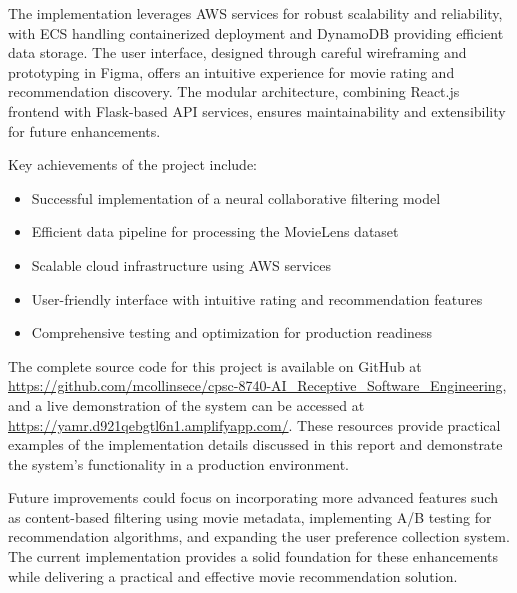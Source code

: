 \documentclass[12pt]{article}
\begin{document}
The implementation leverages AWS services for robust scalability and reliability, with ECS handling containerized deployment and DynamoDB providing efficient data storage. The user interface, designed through careful wireframing and prototyping in Figma, offers an intuitive experience for movie rating and recommendation discovery. The modular architecture, combining React.js frontend with Flask-based API services, ensures maintainability and extensibility for future enhancements.

Key achievements of the project include:
\begin{itemize}
    \item Successful implementation of a neural collaborative filtering model
    \item Efficient data pipeline for processing the MovieLens dataset
    \item Scalable cloud infrastructure using AWS services
    \item User-friendly interface with intuitive rating and recommendation features
    \item Comprehensive testing and optimization for production readiness
\end{itemize}

The complete source code for this project is available on GitHub at \url{https://github.com/mcollinsece/cpsc-8740-AI_Receptive_Software_Engineering}, and a live demonstration of the system can be accessed at \url{https://yamr.d921qebgtl6n1.amplifyapp.com/}. These resources provide practical examples of the implementation details discussed in this report and demonstrate the system's functionality in a production environment.

Future improvements could focus on incorporating more advanced features such as content-based filtering using movie metadata, implementing A/B testing for recommendation algorithms, and expanding the user preference collection system. The current implementation provides a solid foundation for these enhancements while delivering a practical and effective movie recommendation solution.
\end{document}
